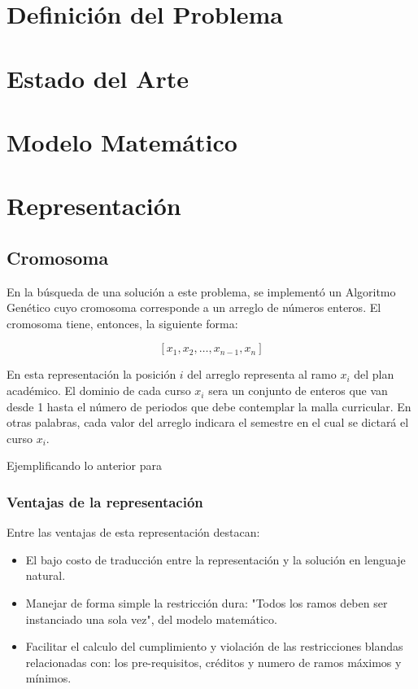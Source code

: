 \documentclass[letter, 10pt]{article}
\begin{document}
\section{Definición del Problema}

\section{Estado del Arte}

\section{Modelo Matemático}


\section{Representación}
\subsection{Cromosoma}
En la búsqueda de una solución a este problema, se implementó un Algoritmo Genético
cuyo cromosoma corresponde a un arreglo de números enteros. El cromosoma tiene, entonces, la siguiente forma:

$$
	[x_{1},x_{2}, \dots ,x_{n-1},x_{n}]
$$

En esta representación la posición $i$ del arreglo representa al ramo $x_{i}$ del plan académico. El dominio
de cada curso $x_{i}$ sera un conjunto de enteros que van desde 1 hasta el número de periodos que debe contemplar la malla
curricular. En otras palabras, cada valor del arreglo indicara el semestre en el cual se dictará el curso $x_{i}$.

Ejemplificando lo anterior para 

\subsubsection{Ventajas de la representación}
Entre las ventajas de esta representación destacan:
\begin{itemize}
	\item El bajo costo de traducción entre la representación y la solución en lenguaje natural.
	\item Manejar de forma simple la restricción dura: "Todos los ramos deben ser instanciado una sola vez",
		del modelo matemático.
	\item Facilitar el calculo del cumplimiento y violación de las restricciones blandas relacionadas con: los pre-requisitos, créditos y numero de ramos máximos y mínimos.
\end{itemize}
\end{document}
